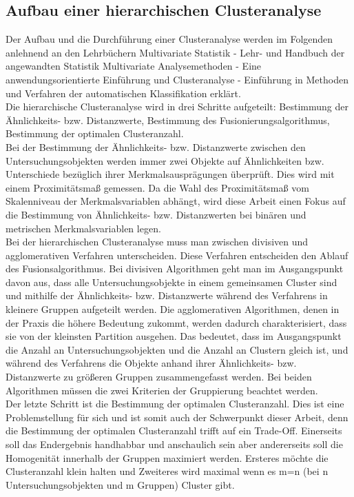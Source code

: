 \documentclass[12pt,titlepage]{article}
\begin{document}
		\subsection{Aufbau einer hierarchischen Clusteranalyse}
			Der Aufbau und die Durchführung einer Clusteranalyse werden im Folgenden anlehnend an den Lehrbüchern \glqq Multivariate Statistik - Lehr- und Handbuch der angewandten Statistik\grqq \cite{Hartung2007} \glqq Multivariate Analysemethoden - Eine anwendungsorientierte Einführung\grqq \cite{Backhaus2015} und \glqq Clusteranalyse - Einführung in Methoden und Verfahren der automatischen Klassifikation\grqq \cite{Steinhausen1977} erklärt. \\
Die hierarchische Clusteranalyse wird in drei Schritte aufgeteilt: Bestimmung der Ähnlichkeits- bzw. Distanzwerte, Bestimmung des Fusionierungsalgorithmus, Bestimmung der optimalen Clusteranzahl. \\
Bei der Bestimmung der Ähnlichkeits- bzw. Distanzwerte zwischen den Untersuchungsobjekten werden immer zwei Objekte auf Ähnlichkeiten bzw. Unterschiede bezüglich ihrer Merkmalsausprägungen überprüft. Dies wird mit einem Proximitätsmaß gemessen. Da die Wahl des Proximitätsmaß vom Skalenniveau der Merkmalsvariablen abhängt, wird diese Arbeit einen Fokus auf die Bestimmung von Ähnlichkeits- bzw. Distanzwerten bei binären und metrischen Merkmalsvariablen legen. \\
Bei der hierarchischen Clusteranalyse muss man zwischen divisiven und agglomerativen Verfahren unterscheiden. Diese Verfahren entscheiden den Ablauf des Fusionsalgorithmus. Bei divisiven Algorithmen geht man im Ausgangspunkt davon aus, dass alle Untersuchungsobjekte in einem gemeinsamen Cluster sind und mithilfe der Ähnlichkeits- bzw. Distanzwerte während des Verfahrens in kleinere Gruppen aufgeteilt werden. Die agglomerativen Algorithmen, denen in der Praxis die höhere Bedeutung zukommt, werden dadurch charakterisiert, dass sie von der kleinsten Partition ausgehen. Das bedeutet, dass im Ausgangspunkt die Anzahl an Untersuchungsobjekten und die Anzahl an Clustern gleich ist, und während des Verfahrens die Objekte anhand ihrer Ähnlichkeits- bzw. Distanzwerte zu größeren Gruppen zusammengefasst werden. Bei beiden Algorithmen müssen die zwei Kriterien der Gruppierung beachtet werden. \\
Der letzte Schritt ist die Bestimmung der optimalen Clusteranzahl. Dies ist eine Problemstellung für sich und ist somit auch der Schwerpunkt dieser Arbeit, denn die Bestimmung der optimalen Clusteranzahl trifft auf ein Trade-Off. Einerseits soll das Endergebnis handhabbar und anschaulich sein aber andererseits soll die Homogenität innerhalb der Gruppen maximiert werden. Ersteres möchte die Clusteranzahl klein halten und Zweiteres wird maximal wenn es m=n (bei n Untersuchungsobjekten und m Gruppen) Cluster gibt.
\end{document}
